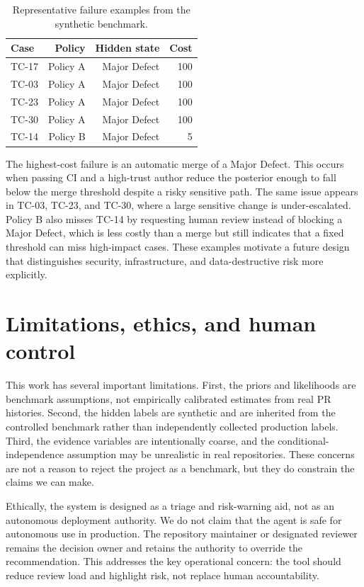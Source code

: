 \documentclass{article}
\begin{document}
\begin{table}[t]
\centering
\caption{Representative failure examples from the synthetic benchmark.}
\label{tab:failures}
\begin{tabular}{lrrr}
\toprule
Case & Policy & Hidden state & Cost \\
\midrule
TC-17 & Policy A & Major Defect & 100 \\
TC-03 & Policy A & Major Defect & 100 \\
TC-23 & Policy A & Major Defect & 100 \\
TC-30 & Policy A & Major Defect & 100 \\
TC-14 & Policy B & Major Defect & 5 \\
\bottomrule
\end{tabular}
\end{table}

The highest-cost failure is an automatic merge of a Major Defect. This occurs when passing CI and a high-trust author reduce the posterior enough to fall below the merge threshold despite a risky sensitive path. The same issue appears in TC-03, TC-23, and TC-30, where a large sensitive change is under-escalated. Policy B also misses TC-14 by requesting human review instead of blocking a Major Defect, which is less costly than a merge but still indicates that a fixed threshold can miss high-impact cases. These examples motivate a future design that distinguishes security, infrastructure, and data-destructive risk more explicitly.

\section{Limitations, ethics, and human control}

This work has several important limitations. First, the priors and likelihoods are benchmark assumptions, not empirically calibrated estimates from real PR histories. Second, the hidden labels are synthetic and are inherited from the controlled benchmark rather than independently collected production labels. Third, the evidence variables are intentionally coarse, and the conditional-independence assumption may be unrealistic in real repositories. These concerns are not a reason to reject the project as a benchmark, but they do constrain the claims we can make.

Ethically, the system is designed as a triage and risk-warning aid, not as an autonomous deployment authority. We do not claim that the agent is safe for autonomous use in production. The repository maintainer or designated reviewer remains the decision owner and retains the authority to override the recommendation. This addresses the key operational concern: the tool should reduce review load and highlight risk, not replace human accountability.
\end{document}
